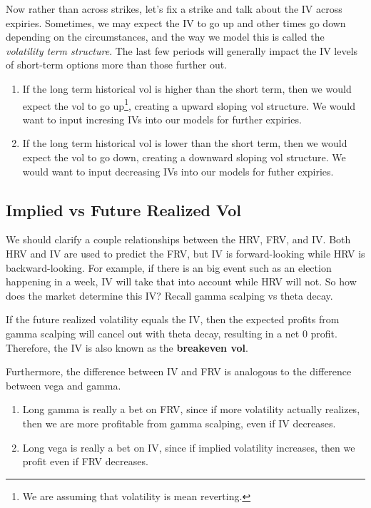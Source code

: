 \documentclass{article}
\begin{document}
    Now rather than across strikes, let's fix a strike and talk about the IV across expiries. Sometimes, we may expect the IV to go up and other times go down depending on the circumstances, and the way we model this is called the \textit{volatility term structure}. The last few periods will generally impact the IV levels of short-term options more than those further out.

    \begin{definition}
      \begin{enumerate}
        \item If the long term historical vol is higher than the short term, then we would expect the vol to go up\footnote{We are assuming that volatility is mean reverting. }, creating a upward sloping vol structure. We would want to input incresing IVs into our models for further expiries.
        \item If the long term historical vol is lower than the short term, then we would expect the vol to go down, creating a downward sloping vol structure. We would want to input decreasing IVs into our models for futher expiries.
      \end{enumerate}
    \end{definition}

  \subsection{Implied vs Future Realized Vol}

    We should clarify a couple relationships between the HRV, FRV, and IV. Both HRV and IV are used to predict the FRV, but IV is forward-looking while HRV is backward-looking. For example, if there is an big event such as an election happening in a week, IV will take that into account while HRV will not. So how does the market determine this IV? Recall gamma scalping vs theta decay. 

    \begin{theorem}
      If the future realized volatility equals the IV, then the expected profits from gamma scalping will cancel out with theta decay, resulting in a net $0$ profit. Therefore, the IV is also known as the \textbf{breakeven vol}. 
    \end{theorem}

    Furthermore, the difference between IV and FRV is analogous to the difference between vega and gamma. 
    \begin{enumerate}
      \item Long gamma is really a bet on FRV, since if more volatility actually realizes, then we are more profitable from gamma scalping, even if IV decreases. 
      \item Long vega is really a bet on IV, since if implied volatility increases, then we profit even if FRV decreases. 
    \end{enumerate}
\end{document}
